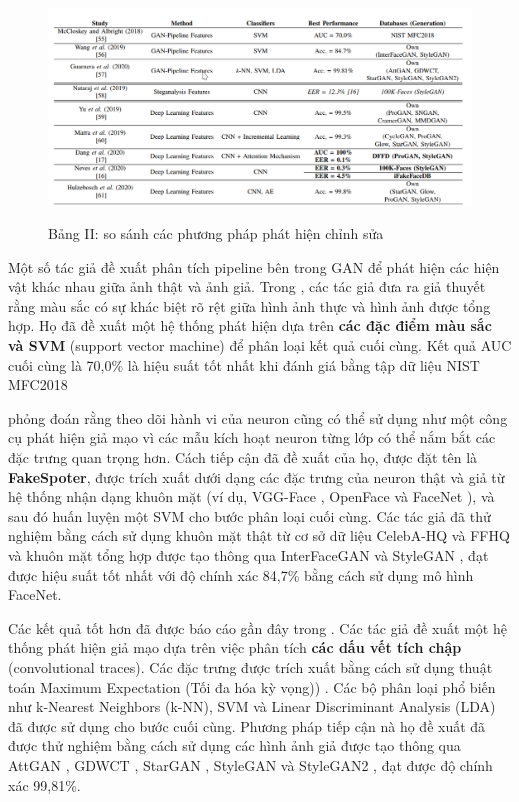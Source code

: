 \documentclass{article}
\begin{document}
\begin{figure}[h!]
\caption{Bảng II: so sánh các phương pháp phát hiện chỉnh sửa}
\includegraphics[width=\textwidth]{table-2-compare}
\label{table-2-compare}
\end{figure}

Một số tác giả đề xuất phân tích pipeline bên trong GAN để phát hiện các hiện vật khác nhau giữa ảnh thật và ảnh giả. Trong , các tác giả đưa ra giả thuyết rằng màu sắc có sự khác biệt rõ rệt giữa hình ảnh thực và hình ảnh được tổng hợp. Họ đã đề xuất một hệ thống phát hiện dựa trên \textbf{các đặc điểm màu sắc và SVM} (support vector machine) để phân loại kết quả cuối cùng. Kết quả AUC cuối cùng là 70,0\% là hiệu suất tốt nhất khi đánh giá bằng tập dữ liệu NIST MFC2018 

 phỏng đoán rằng theo dõi hành vi của neuron cũng có thể sử dụng như một công cụ phát hiện giả mạo vì các mẫu kích hoạt neuron từng lớp có thể nắm bắt các đặc trưng quan trọng hơn. Cách tiếp cận đã đề xuất của họ, được đặt tên là \textbf{FakeSpoter}, được trích xuất dưới dạng các đặc trưng của neuron thật và giả từ hệ thống nhận dạng khuôn mặt (ví dụ, VGG-Face , OpenFace  và FaceNet ), và sau đó huấn luyện một SVM cho bước phân loại cuối cùng. Các tác giả đã thử nghiệm bằng cách sử dụng khuôn mặt thật từ cơ sở dữ liệu CelebA-HQ  và FFHQ  và khuôn mặt tổng hợp được tạo thông qua InterFaceGAN  và StyleGAN , đạt được hiệu suất tốt nhất với độ chính xác 84,7\% bằng cách sử dụng mô hình FaceNet.

Các kết quả tốt hơn đã được báo cáo gần đây trong . Các tác giả đề xuất một hệ thống phát hiện giả mạo dựa trên việc phân tích \textbf{các dấu vết tích chập} (convolutional traces). Các đặc trưng được trích xuất bằng cách sử dụng thuật toán Maximum Expectation (Tối đa hóa kỳ vọng)) . Các bộ phân loại phổ biến như k-Nearest Neighbors (k-NN), SVM và Linear Discriminant Analysis (LDA) đã được sử dụng cho bước cuối cùng. Phương pháp tiếp cận nà họ đề xuất đã được thử nghiệm bằng cách sử dụng các hình ảnh giả được tạo thông qua AttGAN , GDWCT , StarGAN , StyleGAN và StyleGAN2 , đạt được độ chính xác 99,81\%.
\end{document}
